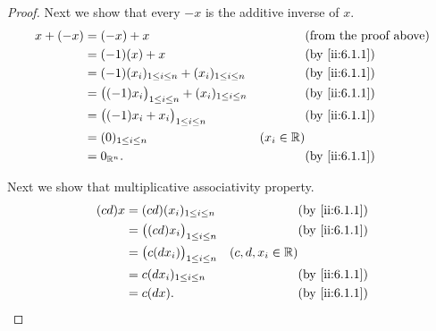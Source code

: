 \begin{proof}
  Next we show that every \(-x\) is the additive inverse of \(x\).
  \begin{align*}
    x + (-x) & = (-x) + x                                                      &              & \text{(from the proof above)} \\
             & = (-1)(x) + x                                                   &              & \by{ii:6.1.1}                 \\
             & = (-1)(x_i)_{1 \leq i \leq n} + (x_i)_{1 \leq i \leq n}         &              & \by{ii:6.1.1}                 \\
             & = \big((-1)x_i\big)_{1 \leq i \leq n} + (x_i)_{1 \leq i \leq n} &              & \by{ii:6.1.1}                 \\
             & = \big((-1)x_i + x_i\big)_{1 \leq i \leq n}                     &              & \by{ii:6.1.1}                 \\
             & = (0)_{1 \leq i \leq n}                                         & (x_i \in \R)                                 \\
             & = 0_{\R^n}.                                                     &              & \by{ii:6.1.1}
  \end{align*}

  Next we show that multiplicative associativity property.
  \begin{align*}
    (cd)x & = (cd)(x_i)_{1 \leq i \leq n}          &                    & \by{ii:6.1.1} \\
          & = \big((cd) x_i\big)_{1 \leq i \leq n} &                    & \by{ii:6.1.1} \\
          & = \big(c(d x_i)\big)_{1 \leq i \leq n} & (c, d, x_i \in \R)                 \\
          & = c(d x_i)_{1 \leq i \leq n}           &                    & \by{ii:6.1.1} \\
          & = c(dx).                               &                    & \by{ii:6.1.1}
  \end{align*}


\end{proof}
